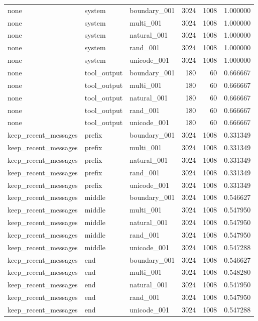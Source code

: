 \begin{tabular}{lllrrr}
none & system & boundary_001 & 3024 & 1008 & 1.000000 \\
none & system & multi_001 & 3024 & 1008 & 1.000000 \\
none & system & natural_001 & 3024 & 1008 & 1.000000 \\
none & system & rand_001 & 3024 & 1008 & 1.000000 \\
none & system & unicode_001 & 3024 & 1008 & 1.000000 \\
none & tool_output & boundary_001 & 180 & 60 & 0.666667 \\
none & tool_output & multi_001 & 180 & 60 & 0.666667 \\
none & tool_output & natural_001 & 180 & 60 & 0.666667 \\
none & tool_output & rand_001 & 180 & 60 & 0.666667 \\
none & tool_output & unicode_001 & 180 & 60 & 0.666667 \\
keep_recent_messages & prefix & boundary_001 & 3024 & 1008 & 0.331349 \\
keep_recent_messages & prefix & multi_001 & 3024 & 1008 & 0.331349 \\
keep_recent_messages & prefix & natural_001 & 3024 & 1008 & 0.331349 \\
keep_recent_messages & prefix & rand_001 & 3024 & 1008 & 0.331349 \\
keep_recent_messages & prefix & unicode_001 & 3024 & 1008 & 0.331349 \\
keep_recent_messages & middle & boundary_001 & 3024 & 1008 & 0.546627 \\
keep_recent_messages & middle & multi_001 & 3024 & 1008 & 0.547950 \\
keep_recent_messages & middle & natural_001 & 3024 & 1008 & 0.547950 \\
keep_recent_messages & middle & rand_001 & 3024 & 1008 & 0.547950 \\
keep_recent_messages & middle & unicode_001 & 3024 & 1008 & 0.547288 \\
keep_recent_messages & end & boundary_001 & 3024 & 1008 & 0.546627 \\
keep_recent_messages & end & multi_001 & 3024 & 1008 & 0.548280 \\
keep_recent_messages & end & natural_001 & 3024 & 1008 & 0.547950 \\
keep_recent_messages & end & rand_001 & 3024 & 1008 & 0.547950 \\
keep_recent_messages & end & unicode_001 & 3024 & 1008 & 0.547288 \\

\end{tabular}
